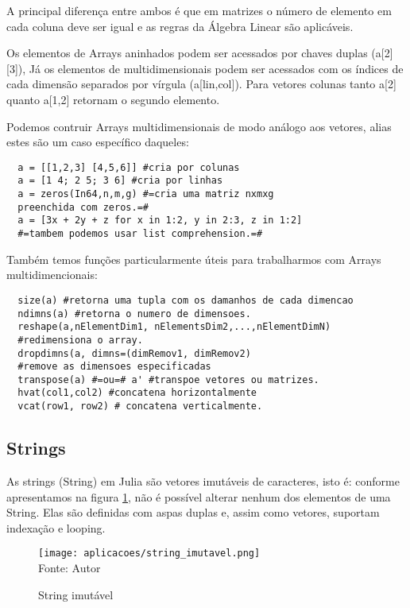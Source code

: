 A principal diferença entre ambos é que em matrizes o número de elemento em cada coluna deve ser igual e as regras da Álgebra Linear são aplicáveis. 


Os elementos de Arrays aninhados podem ser acessados por chaves duplas (a[2][3]), Já os elementos de multidimensionais podem ser acessados com os índices de cada dimensão separados por vírgula (a[lin,col]). Para vetores colunas tanto a[2] quanto a[1,2] retornam o segundo elemento. 

Podemos contruir Arrays multidimensionais de modo análogo aos vetores, alias estes são um caso específico daqueles:
\begin{lstlisting}
  a = [[1,2,3] [4,5,6]] #cria por colunas
  a = [1 4; 2 5; 3 6] #cria por linhas
  a = zeros(In64,n,m,g) #=cria uma matriz nxmxg 
  preenchida com zeros.=#
  a = [3x + 2y + z for x in 1:2, y in 2:3, z in 1:2] 
  #=tambem podemos usar list comprehension.=#
\end{lstlisting}

Também temos funções particularmente úteis para trabalharmos com Arrays multidimencionais:
\begin{lstlisting}
  size(a) #retorna uma tupla com os damanhos de cada dimencao
  ndimns(a) #retorna o numero de dimensoes.
  reshape(a,nElementDim1, nElementsDim2,...,nElementDimN) 
  #redimensiona o array.
  dropdimns(a, dimns=(dimRemov1, dimRemov2) 
  #remove as dimensoes especificadas
  transpose(a) #=ou=# a' #transpoe vetores ou matrizes.
  hvat(col1,col2) #concatena horizontalmente
  vcat(row1, row2) # concatena verticalmente. 
\end{lstlisting}
\subsection{Strings}
As strings (String) em Julia são vetores imutáveis de caracteres, isto é: conforme apresentamos na figura \ref{string_imutavel}, não é possível alterar nenhum dos elementos de uma String. 
Elas são definidas com aspas duplas e, assim como vetores, suportam indexação e looping.

\begin{figure}[H]
\begin{center}
    \caption{String imutável} \label{string_imutavel}
    \texttt{[image: aplicacoes/string\_imutavel.png]} \\
    {\tiny \sf Fonte: Autor}
\end{center}
\end{figure} 

